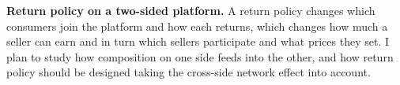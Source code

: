 \documentclass[11pt]{article}
\begin{document}
\textbf{Return policy on a two-sided platform.} A return policy changes which consumers join the platform and how each returns, which changes how much a seller can earn and in turn which sellers participate and what prices they set. I plan to study how composition on one side feeds into the other, and how return policy should be designed taking the cross-side network effect into account.
\end{document}
